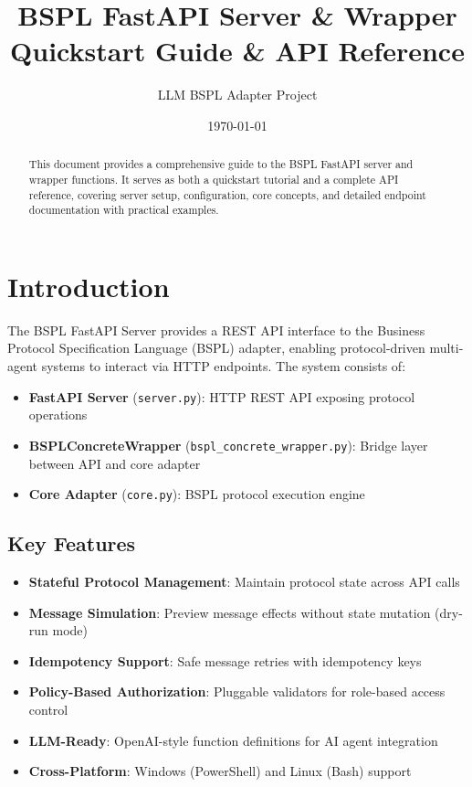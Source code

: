 \documentclass[11pt,a4paper]{article}
\title{\textbf{BSPL FastAPI Server \& Wrapper} \\ 
\large Quickstart Guide \& API Reference}
\author{LLM BSPL Adapter Project}
\date{\today}
\begin{document}
\maketitle

\begin{abstract}
This document provides a comprehensive guide to the BSPL FastAPI server and wrapper functions. It serves as both a quickstart tutorial and a complete API reference, covering server setup, configuration, core concepts, and detailed endpoint documentation with practical examples.
\end{abstract}

\tableofcontents
\newpage

\section{Introduction}

The BSPL FastAPI Server provides a REST API interface to the Business Protocol Specification Language (BSPL) adapter, enabling protocol-driven multi-agent systems to interact via HTTP endpoints. The system consists of:

\begin{itemize}
    \item \textbf{FastAPI Server} (\texttt{server.py}): HTTP REST API exposing protocol operations
    \item \textbf{BSPLConcreteWrapper} (\texttt{bspl\_concrete\_wrapper.py}): Bridge layer between API and core adapter
    \item \textbf{Core Adapter} (\texttt{core.py}): BSPL protocol execution engine
\end{itemize}

\subsection{Key Features}

\begin{itemize}[leftmargin=*]
    \item \textbf{Stateful Protocol Management}: Maintain protocol state across API calls
    \item \textbf{Message Simulation}: Preview message effects without state mutation (dry-run mode)
    \item \textbf{Idempotency Support}: Safe message retries with idempotency keys
    \item \textbf{Policy-Based Authorization}: Pluggable validators for role-based access control
    \item \textbf{LLM-Ready}: OpenAI-style function definitions for AI agent integration
    \item \textbf{Cross-Platform}: Windows (PowerShell) and Linux (Bash) support
\end{itemize}
\end{document}
